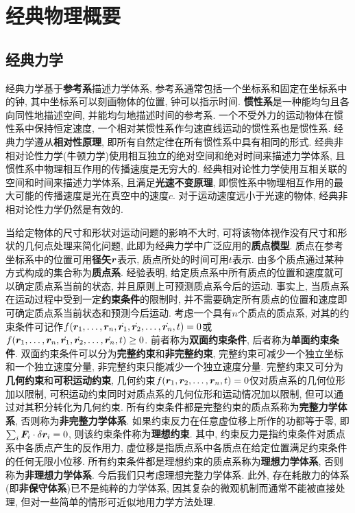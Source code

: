 \chapter[经典物理概要]{经典物理概要}
\section[经典力学]{经典力学}\label{经典力学}
经典力学基于\textbf{参考系}描述力学体系, 参考系通常包括一个坐标系和固定在坐标系中的钟, 其中坐标系可以刻画物体的位置, 钟可以指示时间. \textbf{惯性系}是一种能均匀且各向同性地描述空间, 并能均匀地描述时间的参考系. 一个不受外力的运动物体在惯性系中保持恒定速度, 一个相对某惯性系作匀速直线运动的惯性系也是惯性系. 经典力学遵从\textbf{相对性原理}, 即所有自然定律在所有惯性系中具有相同的形式. 经典非相对论性力学(牛顿力学)使用相互独立的绝对空间和绝对时间来描述力学体系, 且惯性系中物理相互作用的传播速度是无穷大的. 经典相对论性力学使用互相关联的空间和时间来描述力学体系, 且满足\textbf{光速不变原理}, 即惯性系中物理相互作用的最大可能的传播速度是光在真空中的速度$ c $. 对于运动速度远小于光速的物体, 经典非相对论性力学仍然是有效的.

当给定物体的尺寸和形状对运动问题的影响不大时, 可将该物体视作没有尺寸和形状的几何点处理来简化问题, 此即为经典力学中广泛应用的\textbf{质点模型}. 质点在参考坐标系中的位置可用\textbf{径矢}$ \vb*{r} $表示, 质点所处的时间可用$ t $表示. 由多个质点通过某种方式构成的集合称为\textbf{质点系}. 经验表明, 给定质点系中所有质点的位置和速度就可以确定质点系当前的状态, 并且原则上可预测质点系今后的运动. 事实上, 当质点系在运动过程中受到一定\textbf{约束条件}的限制时, 并不需要确定所有质点的位置和速度即可确定质点系当前状态和预测今后运动. 考虑一个具有$ n $个质点的质点系, 对其的约束条件可记作$ f(\vb*{r}_1,\ldots,\vb*{r}_n,\dot{\vb*{r}_1},\dot{\vb*{r}_2},\ldots,\dot{\vb*{r}_n},t)=0 $或$ f(\vb*{r}_1,\ldots,\vb*{r}_n,\dot{\vb*{r}_1},\dot{\vb*{r}_2},\ldots,\dot{\vb*{r}_n},t) \geq 0 $. 前者称为\textbf{双面约束条件}, 后者称为\textbf{单面约束条件}. 双面约束条件可以分为\textbf{完整约束}和\textbf{非完整约束}, 完整约束可减少一个独立坐标和一个独立速度分量, 非完整约束只能减少一个独立速度分量. 完整约束又可分为\textbf{几何约束}和\textbf{可积运动约束}, 几何约束$ f(\vb*{r}_1,\vb*{r}_2,\ldots,\vb*{r}_n,t)=0 $仅对质点系的几何位形加以限制, 可积运动约束同时对质点系的几何位形和运动情况加以限制, 但可以通过对其积分转化为几何约束. 所有约束条件都是完整约束的质点系称为\textbf{完整力学体系}, 否则称为\textbf{非完整力学体系}. 如果约束反力在任意虚位移上所作的功都等于零, 即$ \sum_i \vb*{F}_i \cdot \var{\vb*{r}_i} = 0 $, 则该约束条件称为\textbf{理想约束}. 其中, 约束反力是指约束条件对质点系中各质点产生的反作用力, 虚位移是指质点系中各质点在给定位置满足约束条件的任何无限小位移. 所有约束条件都是理想约束的质点系称为\textbf{理想力学体系}, 否则称为\textbf{非理想力学体系}. 今后我们只考虑理想完整力学体系. 此外, 存在耗散力的体系(即\textbf{非保守体系})已不是纯粹的力学体系, 因其复杂的微观机制而通常不能被直接处理, 但对一些简单的情形可近似地用力学方法处理.

